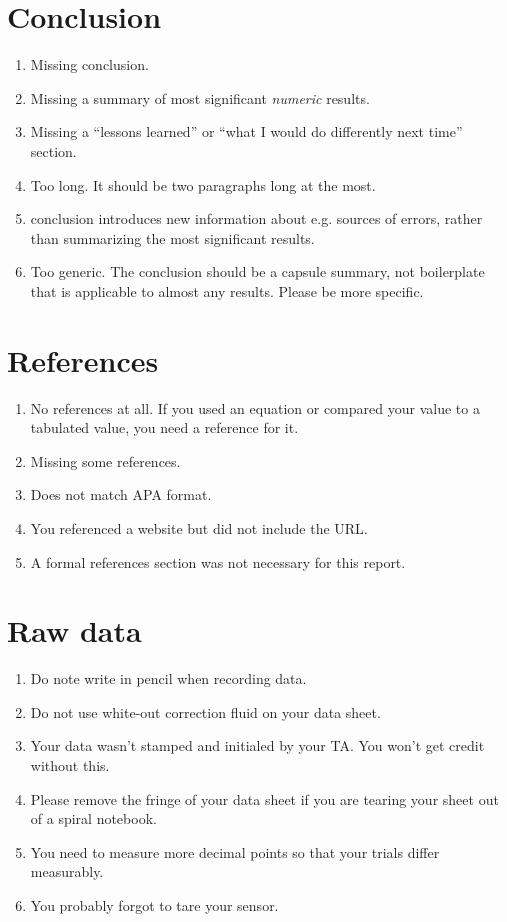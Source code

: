 \documentclass[12pt,letterpaper]{article}
\begin{document}
\begin{multicols}{2}
\section{Conclusion}

\begin{enumerate}[start=140]
  \item Missing conclusion.
  \item Missing a summary of most significant \emph{numeric} results.
  \item Missing a ``lessons learned'' or
    ``what I would do differently next time'' section.
  \item Too long.
    It should be two paragraphs long at the most.
  \item conclusion introduces new information about e.g. sources of errors,
    rather than summarizing the most significant results.
  \item Too generic.
    The conclusion should be a capsule summary,
    not boilerplate that is applicable to almost any results.
    Please be more specific.
\end{enumerate}

\section{References}

\begin{enumerate}[start=150]
  \item No references at all.
    If you used an equation or compared your value to a tabulated value,
    you need a reference for it.
  \item Missing some references.
  \item Does not match APA format.
  \item You referenced a website but did not include the URL.
  \item A formal references section was not necessary for this report.
\end{enumerate}

\section*{Raw data}

\begin{enumerate}[start=160]
  \item Do note write in pencil when recording data.
  \item Do not use white-out correction fluid on your data sheet.
  \item Your data wasn't stamped and initialed by your TA.
    You won't get credit without this.
  \item Please remove the fringe of your data sheet
    if you are tearing your sheet out of a spiral notebook.
  \item You need to measure more decimal points
    so that your trials differ measurably.
  \item You probably forgot to tare your sensor.
\end{enumerate}

\end{multicols}
\end{document}
